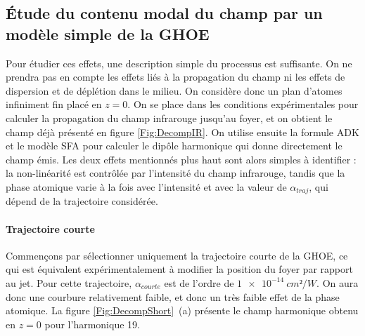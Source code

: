 \subsection{\'{E}tude du contenu modal du champ par un modèle simple de la GHOE}
Pour étudier ces effets, une description simple du processus est suffisante. On ne prendra pas en compte les effets liés à la propagation du champ ni les effets de dispersion et de déplétion dans le milieu. On considère donc un plan d'atomes infiniment fin placé en $z=0$. On se place dans les conditions expérimentales pour calculer la propagation du champ infrarouge jusqu'au foyer, et on obtient le champ déjà présenté en figure \ref{Fig:DecompIR}. On utilise ensuite la formule ADK  et le modèle SFA  pour calculer le dipôle harmonique qui donne directement le champ émis. Les deux effets mentionnés plus haut sont alors simples à identifier : la non-linéarité est contrôlée par l'intensité du champ infrarouge, tandis que la phase atomique varie à la fois avec l'intensité et avec la valeur de $\alpha_{traj}$, qui dépend de la trajectoire considérée.

\paragraph*{Trajectoire courte} Commençons par sélectionner uniquement la trajectoire courte de la GHOE, ce qui est équivalent expérimentalement à modifier la position du foyer par rapport au jet. Pour cette trajectoire, $\alpha_{courte}$ est de l'ordre de $\SI{1e-14}{cm²/W}$. On aura donc une courbure relativement faible, et donc un très faible effet de la phase atomique. La figure \ref{Fig:DecompShort}~(a) présente le champ harmonique obtenu en $z=0$ pour l'harmonique 19.

